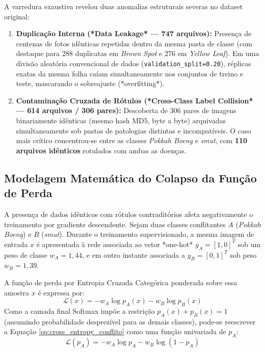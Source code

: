 A varredura exaustiva revelou duas anomalias estruturais severas no dataset original:
\begin{enumerate}
    \item \textbf{Duplicação Interna (*Data Leakage* — 747 arquivos):} Presença de centenas de fotos idênticas repetidas dentro da mesma pasta de classe (com destaque para 288 duplicatas em \textit{Brown Spot} e 276 em \textit{Yellow Leaf}). Em uma divisão aleatória convencional de dados (\texttt{validation\_split=0.20}), réplicas exatas da mesma folha caíam simultaneamente nos conjuntos de treino e teste, mascarando o sobreajuste (*overfitting*).
    \item \textbf{Contaminação Cruzada de Rótulos (*Cross-Class Label Collision* — 614 arquivos / 306 pares):} Descoberta de 306 pares de imagens binariamente idênticas (mesmo hash MD5, byte a byte) arquivadas simultaneamente sob pastas de patologias distintas e incompatíveis. O caso mais crítico concentrou-se entre as classes \textit{Pokkah Boeng} e \textit{smut}, com \textbf{110 arquivos idênticos} rotulados com ambas as doenças.
\end{enumerate}

\subsection{Modelagem Matemática do Colapso da Função de Perda}

A presença de dados idênticos com rótulos contraditórios afeta negativamente o treinamento por gradiente descendente. Sejam duas classes conflitantes $A$ (\textit{Pokkah Boeng}) e $B$ (\textit{smut}). Durante o treinamento supervisionado, a mesma imagem de entrada $x$ é apresentada à rede associada ao vetor *one-hot* $y_A = [1, 0]^T$ sob um peso de classe $w_A = 1,44$, e em outro instante associada a $y_B = [0, 1]^T$ sob peso $w_B = 1,39$.

A função de perda por Entropia Cruzada Categórica ponderada sobre essa amostra $x$ é expressa por:
\begin{equation}
\mathcal{L}(x) = - w_A \log p_A(x) - w_B \log p_B(x)
\label{eq:cross_entropy_conflito}
\end{equation}
Como a camada final Softmax impõe a restrição $p_A(x) + p_B(x) = 1$ (assumindo probabilidade desprezível para as demais classes), pode-se reescrever a Equação \ref{eq:cross_entropy_conflito} como uma função univariada de $p_A$:
\begin{equation}
\mathcal{L}(p_A) = - w_A \log p_A - w_B \log (1 - p_A)
\end{equation}

